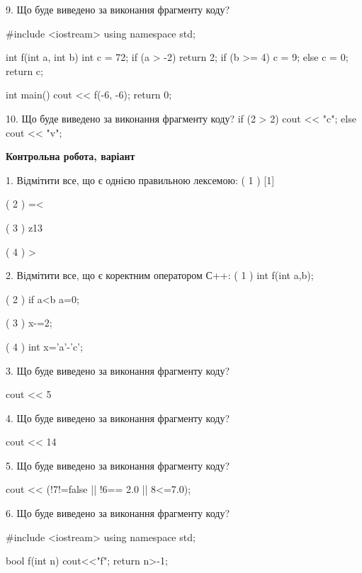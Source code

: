 \documentclass[11pt, ukrainian]{article}
\begin{document}
\begin{large}

9. Що буде виведено за виконання фрагменту коду?

#include <iostream>
using namespace std;

int f(int a, int b){
    int c = 72;
    if (a > -2)
        return 2;
    if (b >= 4)
         c = 9;
    else 
        c = 0;
    return c;
}

int main(){
    cout << f(-6, -6);
    return 0;
}


10. Що буде виведено за виконання фрагменту коду?
if (2 > 2)
    cout << "c";
else
    cout << "v";


\end{large}
\vspace{20mm}
\begin{large}
\textbf{Контрольна робота, варіант }\par

1. Відмітити все, що є однією правильною лексемою:
( 1 ) [1]

( 2 ) =<

( 3 ) z13

( 4 ) >


2. Відмітити все, що є коректним оператором С++:
( 1 ) int f(int a,b);

( 2 ) if a<b a=0;

( 3 ) x-=2;

( 4 ) int x='a'-'c';


3. Що буде виведено за виконання фрагменту коду?

cout << 5 %


4. Що буде виведено за виконання фрагменту коду?

cout << 14 %


5. Що буде виведено за виконання фрагменту коду?

cout << (!7!=false || !6== 2.0 || 8<=7.0);


6. Що буде виведено за виконання фрагменту коду?

#include <iostream>
using namespace std;

bool f(int n){
    cout<<"f";
    return n>-1;
}


\end{large}
\end{document}
